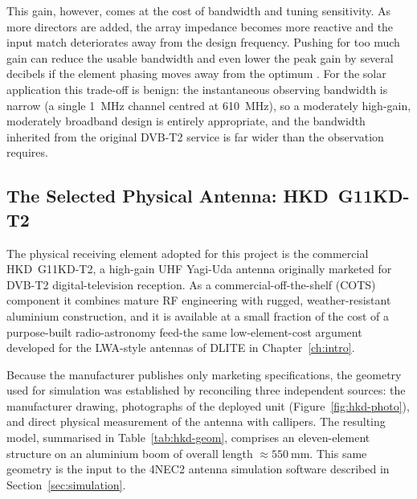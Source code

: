 This gain, however, comes at the cost of bandwidth and tuning sensitivity. As
more directors are added, the array impedance becomes more reactive and the
input match deteriorates away from the design frequency. Pushing for too much
gain can reduce the usable bandwidth and even lower the peak gain by several
decibels if the element phasing moves away from the optimum \citep{stutzman2013}. For the solar application this trade-off is benign: the
instantaneous observing bandwidth is narrow (a single \SI{1}{\mega\hertz}
channel centred at \SI{610}{\mega\hertz}), so a moderately high-gain,
moderately broadband design is entirely appropriate, and the bandwidth inherited
from the original DVB-T2 service is far wider than the observation requires.

\subsection{The Selected Physical Antenna: HKD~G11KD-T2}
\label{subsec:hkd-spec}

The physical receiving element adopted for this project is the commercial
HKD~G11KD-T2, a high-gain UHF Yagi-Uda antenna originally marketed for DVB-T2
digital-television reception. As a commercial-off-the-shelf (COTS) component it
combines mature RF engineering with rugged, weather-resistant aluminium
construction, and it is available at a small fraction of the cost of a
purpose-built radio-astronomy feed-the same low-element-cost argument
developed for the LWA-style antennas of DLITE in Chapter~\ref{ch:intro}.

Because the manufacturer publishes only marketing specifications, the geometry
used for simulation was established by reconciling three independent sources:
the manufacturer drawing, photographs of the deployed unit
(Figure~\ref{fig:hkd-photo}), and direct physical measurement of the antenna
with callipers. The resulting model, summarised in Table~\ref{tab:hkd-geom},
comprises an eleven-element structure on an aluminium boom of overall length
$\approx\!\SI{550}{\milli\metre}$. This same geometry is the input to the
4NEC2 antenna simulation software described in Section~\ref{sec:simulation}.

